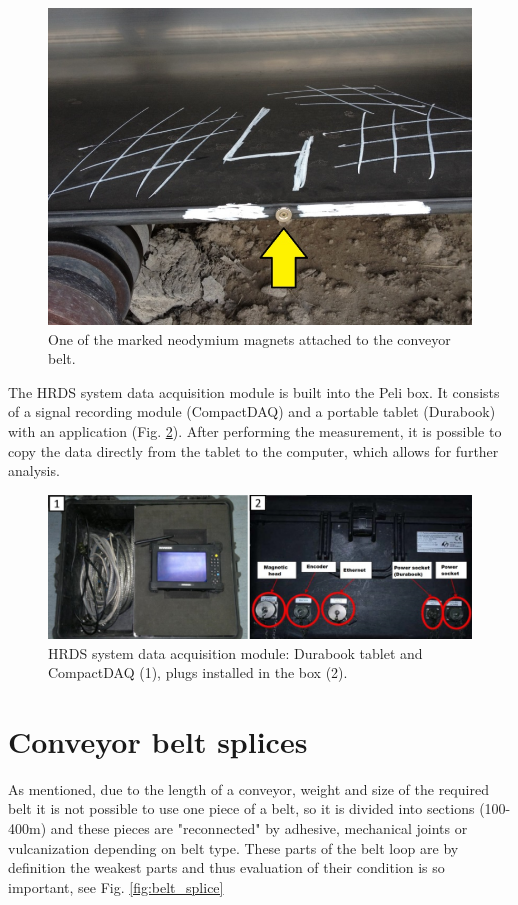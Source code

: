 \documentclass[applsci,article,preprint,moreauthors,pdftex]{Definitions/mdpi}
\begin{document}
\begin{figure}[ht!]
\centering
\includegraphics[width=.6\textwidth]{figs/hrds4.png}
\caption{One of the marked neodymium magnets attached to the conveyor belt.}
\label{fig:hrds4}
\end{figure}

The HRDS system data acquisition module is built into the Peli box. It consists of a signal recording module (CompactDAQ) and a portable tablet (Durabook) with an application (Fig. \ref{fig:hrds5}). After performing the measurement, it is possible to copy the data directly from the tablet to the computer, which allows for further analysis.

\begin{figure}[ht!]
\centering
\includegraphics[width=\textwidth]{figs/hrds5.png}
\caption{HRDS system data acquisition module: Durabook tablet and CompactDAQ (1), plugs installed in the box (2).}
\label{fig:hrds5}
\end{figure}

\section{Conveyor belt splices}

As mentioned, due to the length of a conveyor, weight and size of the required belt it is not possible to use one piece of a belt, so it is divided into sections (100-400m) and these pieces are "reconnected" by adhesive, mechanical joints or vulcanization depending on belt type. These parts of the belt loop are by definition the weakest parts and thus evaluation of their condition is so important, see Fig. \ref{fig:belt_splice}
\end{document}
